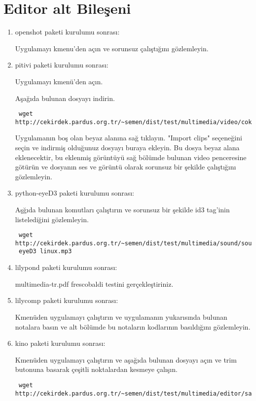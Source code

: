 \documentclass[a4paper,10pt]{article}
\begin{document}
\section{Editor alt Bileşeni}

\begin{enumerate}
\item openshot paketi kurulumu sonrası:

Uygulamayı kmenu'den açın ve sorunsuz çalıştığını gözlemleyin.

\item pitivi paketi kurulumu sonrası:

Uygulamayı kmenü'den açın. 

Aşağıda bulunan dosyayı indirin. 
\begin{verbatim}
 wget http://cekirdek.pardus.org.tr/~semen/dist/test/multimedia/video/cokluortam/Lake_dance_XviD.AVI
\end{verbatim}

Uygulamanın boş olan beyaz alanına sağ tıklayın. "Import clips" seçeneğini seçin ve indirmiş olduğunuz dosyayı buraya ekleyin. Bu dosya beyaz alana eklenecektir, bu eklenmiş görüntüyü sağ bölümde bulunan video penceresine götürün ve dosyanın ses ve görüntü olarak sorunsuz bir şekilde çalıştığını gözlemleyin.

\item python-eyeD3 paketi kurulumu sonrası:

Aşğıda bulunan komutları çalıştırın ve sorunsuz bir şekilde id3 tag'inin listelediğini gözlemleyin.
\begin{verbatim}
 wget http://cekirdek.pardus.org.tr/~semen/dist/test/multimedia/sound/sound/sample.mp3
 eyeD3 linux.mp3 
\end{verbatim}

\item lilypond paketi kurulumu sonrası:

  multimedia-tr.pdf frescobaldi testini gerçekleştiriniz.

\item lilycomp paketi kurulumu sonrası:
   
 Kmenüden uygulamayı çalıştırın ve uygulamanın yukarısında bulunan notalara basın ve alt bölümde bu notaların kodlarının basıldığını gözlemleyin.

\item kino paketi kurulumu sonrası:

  Kmenüden uygulamayı çalıştırın ve aşağıda bulunan dosyayı açın ve trim butonuna basarak çeşitli noktalardan kesmeye çalışın.
\begin{verbatim}
 wget http://cekirdek.pardus.org.tr/~semen/dist/test/multimedia/editor/sample.dv
\end{verbatim}



\end{enumerate}
\end{document}
